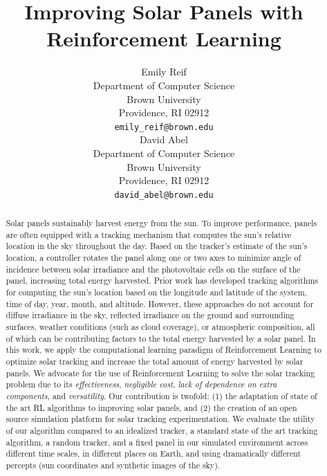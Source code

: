 \documentclass[11pt]{article}
\title{Improving Solar Panels with Reinforcement Learning}
\author{
Emily Reif \\
Department of Computer Science\\
Brown University\\
Providence, RI 02912 \\
\texttt{emily\_reif@brown.edu} \\
\And
David Abel \\
Department of Computer Science\\
Brown University \\
Providence, RI 02912 \\
\texttt{david\_abel@brown.edu} \\
}
\date{}
\begin{document}
\maketitle

\begin{abstract}
Solar panels sustainably harvest energy from the sun. To improve performance, panels are often equipped with a tracking mechanism that computes the sun's relative location in the sky throughout the day. Based on the tracker's estimate of the sun's location, a controller rotates the panel along one or two axes to minimize angle of incidence between solar irradiance and the photovoltaic cells on the surface of the panel, increasing total energy harvested. Prior work has developed tracking algorithms for computing the sun's location based on the longitude and latitude of the system, time of day, year, month, and altitude.
%
However, these approaches do not account for diffuse irradiance in the sky, reflected irradiance on the ground and surrounding surfaces, weather conditions (such as cloud coverage), or atmospheric composition, all of which can be contributing factors to the total energy harvested by a solar panel.
%
In this work, we apply the computational learning paradigm of Reinforcement Learning to optimize solar tracking and increase the total amount of energy harvested by solar panels. We advocate for the use of Reinforcement Learning to solve the solar tracking problem due to its {\it effectiveness}, {\it negligible cost}, {\it lack of dependence on extra components}, and {\it versatility}. Our contribution is twofold: (1) the adaptation of state of the art RL algorithms to improving solar panels, and (2) the creation of an open source simulation platform for solar tracking experimentation. We evaluate the utility of our algorithm compared to an idealized tracker, a standard state of the art tracking algorithm, a random tracker, and a fixed panel in our simulated environment across different time scales, in different places on Earth, and using dramatically different percepts (sun coordinates and synthetic images of the sky).
\end{abstract}

\end{document}
